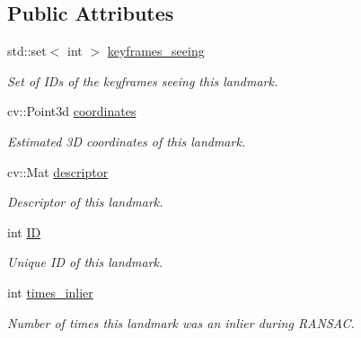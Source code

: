 \subsection*{Public Attributes}
\begin{DoxyCompactItemize}
\item 
\mbox{\label{structLandmark_a72c0ddd12ae0673a13d85a887af82b43}} 
std\+::set$<$ int $>$ \hyperlink{structLandmark_a72c0ddd12ae0673a13d85a887af82b43}{keyframes\+\_\+seeing}
\begin{DoxyCompactList}\small\item\em Set of I\+Ds of the keyframes seeing this landmark. \end{DoxyCompactList}\item 
\mbox{\label{structLandmark_a47a014d563b50c513c914d497638c380}} 
cv\+::\+Point3d \hyperlink{structLandmark_a47a014d563b50c513c914d497638c380}{coordinates}
\begin{DoxyCompactList}\small\item\em Estimated 3D coordinates of this landmark. \end{DoxyCompactList}\item 
\mbox{\label{structLandmark_a0b3dba38446853398db97517bdc86c0b}} 
cv\+::\+Mat \hyperlink{structLandmark_a0b3dba38446853398db97517bdc86c0b}{descriptor}
\begin{DoxyCompactList}\small\item\em Descriptor of this landmark. \end{DoxyCompactList}\item 
\mbox{\label{structLandmark_ab6b387d9b5bf168cff54b75e7057af1f}} 
int \hyperlink{structLandmark_ab6b387d9b5bf168cff54b75e7057af1f}{ID}
\begin{DoxyCompactList}\small\item\em Unique ID of this landmark. \end{DoxyCompactList}\item 
\mbox{\label{structLandmark_a2014817684a0334546b4364b43b054bd}} 
int \hyperlink{structLandmark_a2014817684a0334546b4364b43b054bd}{times\+\_\+inlier}
\begin{DoxyCompactList}\small\item\em Number of times this landmark was an inlier during R\+A\+N\+S\+AC. \end{DoxyCompactList}\item 

\end{DoxyCompactItemize}
